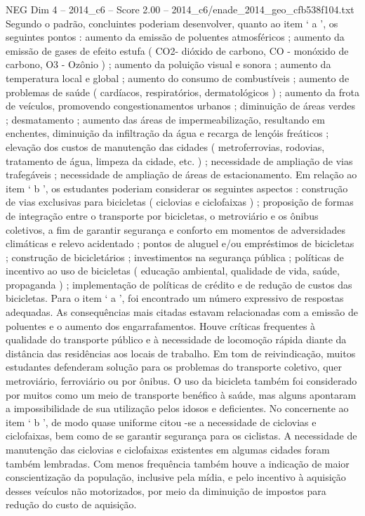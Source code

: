 \begin{textsample}{NEG Dim 4 – 2014\_c6 – Score 2.00 – 2014\_c6/enade\_2014\_geo\_cfb538f104.txt}
Segundo o padrão, concluintes poderiam desenvolver, quanto ao item ‘ a ’, os seguintes pontos : aumento da emissão de poluentes atmosféricos ; aumento da emissão de gases de efeito estufa ( CO2- dióxido de carbono, CO - monóxido de carbono, O3 - Ozônio ) ; aumento da poluição visual e sonora ; aumento da temperatura local e global ; aumento do consumo de combustíveis ; aumento de problemas de saúde ( cardíacos, respiratórios, dermatológicos ) ; aumento da frota de veículos, promovendo congestionamentos urbanos ; diminuição de áreas verdes ; desmatamento ; aumento das áreas de impermeabilização, resultando em enchentes, diminuição da infiltração da água e recarga de lençóis freáticos ; elevação dos custos de manutenção das cidades ( metroferrovias, rodovias, tratamento de água, limpeza da cidade, etc. ) ; necessidade de ampliação de vias trafegáveis ; necessidade de ampliação de áreas de estacionamento.
Em relação ao item ‘ b ’, os estudantes poderiam considerar os seguintes aspectos : construção de vias exclusivas para bicicletas ( ciclovias e ciclofaixas ) ; proposição de formas de integração entre o transporte por bicicletas, o metroviário e os ônibus coletivos, a fim de garantir segurança e conforto em momentos de adversidades climáticas e relevo acidentado ; pontos de aluguel e/ou empréstimos de bicicletas ; construção de bicicletários ; investimentos na segurança pública ; políticas de incentivo ao uso de bicicletas ( educação ambiental, qualidade de vida, saúde, propaganda ) ; implementação de políticas de crédito e de redução de custos das bicicletas.
Para o item ‘ a ’, foi encontrado um número expressivo de respostas adequadas.
As consequências mais citadas estavam relacionadas com a emissão de poluentes e o aumento dos engarrafamentos.
Houve críticas frequentes à qualidade do transporte público e à necessidade de locomoção rápida diante da distância das residências aos locais de trabalho.
Em tom de reivindicação, muitos estudantes defenderam solução para os problemas do transporte coletivo, quer metroviário, ferroviário ou por ônibus.
O uso da bicicleta também foi considerado por muitos como um meio de transporte benéfico à saúde, mas alguns apontaram a impossibilidade de sua utilização pelos idosos e deficientes.
No concernente ao item ‘ b ’, de modo quase uniforme citou -se a necessidade de ciclovias e ciclofaixas, bem como de se garantir segurança para os ciclistas.
A necessidade de manutenção das ciclovias e ciclofaixas existentes em algumas cidades foram também lembradas.
Com menos frequência também houve a indicação de maior conscientização da população, inclusive pela mídia, e pelo incentivo à aquisição desses veículos não motorizados, por meio da diminuição de impostos para redução do custo de aquisição.

\end{textsample}
